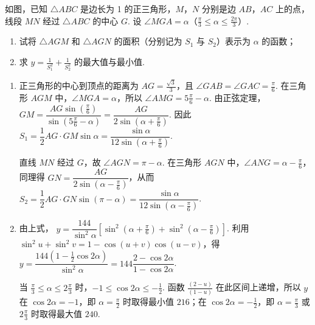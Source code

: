 \begin{problem}
如图，已知 \(\triangle ABC\) 是边长为 1 的正三角形，\(M\)，\(N\) 分别是边 \(AB\)，\(AC\) 上的点，线段 \(MN\) 经过 \(\triangle ABC\) 的中心 \(G\). 设 \(\angle MGA = \alpha\)（\(\frac{\pi}{3} \leqslant \alpha \leqslant \frac{2\pi}{3}\)）.

\begin{enumerate}
\item 试将 \(\triangle AGM\) 和 \(\triangle AGN\) 的面积（分别记为 \(S_1\) 与 \(S_2\)）表示为 \(\alpha\) 的函数；
\item 求 \(y = \frac{1}{S_1^2} + \frac{1}{S_2^2}\) 的最大值与最小值.
\end{enumerate}

\end{problem}

\begin{solution}
\begin{enumerate}
\item 正三角形的中心到顶点的距离为 \(AG=\frac{\sqrt{3}}{3}\)，且 \(\angle GAB=\angle GAC=\frac{\pi}{6}\). 在三角形 \(AGM\) 中，\(\angle MGA=\alpha\)，所以 \(\angle AMG=5\frac{\pi}{6}-\alpha\). 由正弦定理，
\(GM=\dfrac{AG\sin(\frac{\pi}{6})}{\sin(5\frac{\pi}{6}-\alpha)}=\dfrac{AG}{2\sin(\alpha+\frac{\pi}{6})}\). 因此
\(S_1=\dfrac12AG\cdot GM\sin\alpha=\dfrac{\sin\alpha}{12\sin(\alpha+\frac{\pi}{6})}\).

直线 \(MN\) 经过 \(G\)，故 \(\angle AGN=\pi-\alpha\). 在三角形 \(AGN\) 中，\(\angle ANG=\alpha-\frac{\pi}{6}\)，同理得 \(GN=\dfrac{AG}{2\sin(\alpha-\frac{\pi}{6})}\)，从而
\(S_2=\dfrac12AG\cdot GN\sin(\pi-\alpha)=\dfrac{\sin\alpha}{12\sin(\alpha-\frac{\pi}{6})}\).
\item 由上式，
\(y=\dfrac{144}{\sin^2\alpha}\left[\sin^2(\alpha+\frac{\pi}{6})+\sin^2(\alpha-\frac{\pi}{6})\right]\). 利用 \(\sin^2u+\sin^2v=1-\cos(u+v)\cos(u-v)\)，得
\(y=\dfrac{144(1-\frac12\cos2\alpha)}{\sin^2\alpha}=144\dfrac{2-\cos2\alpha}{1-\cos2\alpha}\).

当 \(\frac{\pi}{3}\leqslant\alpha\leqslant2\frac{\pi}{3}\) 时，\(-1\leqslant\cos2\alpha\leqslant-\frac{1}{2}\). 函数 \(\frac{(2-u)}{(1-u)}\) 在此区间上递增，所以 \(y\) 在 \(\cos2\alpha=-1\)，即 \(\alpha=\frac{\pi}{2}\) 时取得最小值 \(216\)；在 \(\cos2\alpha=-\frac{1}{2}\)，即 \(\alpha=\frac{\pi}{3}\) 或 \(2\frac{\pi}{3}\) 时取得最大值 \(240\).
\end{enumerate}
\end{solution}

